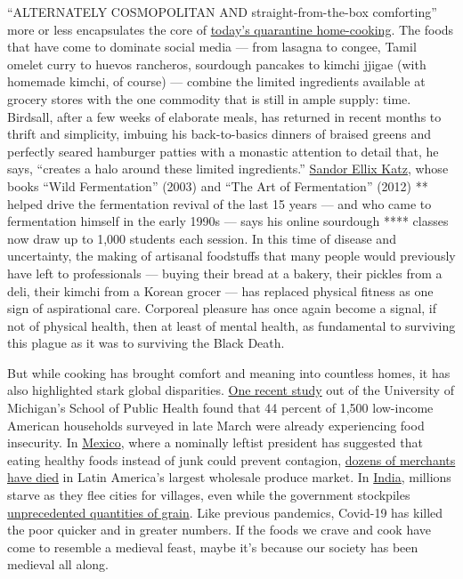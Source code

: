 ``ALTERNATELY COSMOPOLITAN AND straight-from-the-box comforting'' more
or less encapsulates the core of
\href{https://www.nytimes.com/article/recipes-cooking-tips-coronavirus.html}{today's
quarantine home-cooking}. The foods that have come to dominate social
media --- from lasagna to congee, Tamil omelet curry to huevos
rancheros, sourdough pancakes to kimchi jjigae (with homemade kimchi, of
course) --- combine the limited ingredients available at grocery stores
with the one commodity that is still in ample supply: time. Birdsall,
after a few weeks of elaborate meals, has returned in recent months to
thrift and simplicity, imbuing his back-to-basics dinners of braised
greens and perfectly seared hamburger patties with a monastic attention
to detail that, he says, ``creates a halo around these limited
ingredients.''
\href{https://www.wildfermentation.com/who-is-sandorkraut/}{Sandor Ellix
Katz}, whose books ``Wild Fermentation'' (2003) and ``The Art of
Fermentation'' (2012) ** helped drive the fermentation revival of the
last 15 years --- and who came to fermentation himself in the early
1990s --- says his online sourdough **** classes now draw up to 1,000
students each session. In this time of disease and uncertainty, the
making of artisanal foodstuffs that many people would previously have
left to professionals --- buying their bread at a bakery, their pickles
from a deli, their kimchi from a Korean grocer --- has replaced physical
fitness as one sign of aspirational care. Corporeal pleasure has once
again become a signal, if not of physical health, then at least of
mental health, as fundamental to surviving this plague as it was to
surviving the Black Death.

But while cooking has brought comfort and meaning into countless homes,
it has also highlighted stark global disparities.
\href{https://sph.umich.edu/news/2020posts/coronavirus-pandemic-worsens-food-insecurity-for-low-income-adults.html}{One
recent study} out of the University of Michigan's School of Public
Health found that 44 percent of 1,500 low-income American households
surveyed in late March were already experiencing food insecurity. In
\href{https://www.nytimes.com/interactive/2020/world/americas/mexico-coronavirus-cases.html}{Mexico},
where a nominally leftist president has suggested that eating healthy
foods instead of junk could prevent contagion,
\href{https://www.washingtonpost.com/world/2020/06/21/coronavirus-mexico-city-centro-abasto-market/?arc404=true}{dozens
of merchants have died} in Latin America's largest wholesale produce
market. In
\href{https://www.nytimes.com/interactive/2020/world/asia/india-coronavirus-cases.html}{India},
millions starve as they flee cities for villages, even while the
government stockpiles
\href{https://www.bloomberg.com/news/articles/2020-03-24/india-has-enough-food-to-feed-poor-amid-prolonged-shutdown-fears}{unprecedented
quantities of grain}. Like previous pandemics, Covid-19 has killed the
poor quicker and in greater numbers. If the foods we crave and cook have
come to resemble a medieval feast, maybe it's because our society has
been medieval all along.

